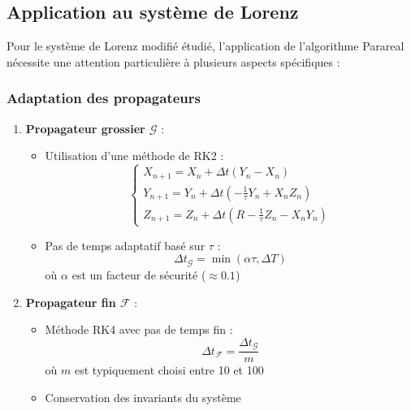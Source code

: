 \subsection{Application au système de Lorenz}
Pour le système de Lorenz modifié étudié, l'application de l'algorithme Parareal nécessite une attention particulière à plusieurs aspects spécifiques :

\subsubsection{Adaptation des propagateurs}
\begin{enumerate}
    \item \textbf{Propagateur grossier $\mathcal{G}$} :
    \begin{itemize}
        \item Utilisation d'une méthode de RK2 :
        \begin{equation}
        \begin{cases}
            X_{n+1} = X_n + \Delta t(Y_n - X_n) \\
            Y_{n+1} = Y_n + \Delta t(-\frac{1}{\tau}Y_n + X_nZ_n) \\
            Z_{n+1} = Z_n + \Delta t(R - \frac{1}{\tau}Z_n - X_nY_n)
        \end{cases}
        \end{equation}
        \item Pas de temps adaptatif basé sur $\tau$ :
        \begin{equation}
        \Delta t_{\mathcal{G}} = \min(\alpha\tau, \Delta T)
        \end{equation}
        où $\alpha$ est un facteur de sécurité ($\approx 0.1$)
    \end{itemize}

    \item \textbf{Propagateur fin $\mathcal{F}$} :
    \begin{itemize}
        \item Méthode RK4 avec pas de temps fin :
        \begin{equation}
        \Delta t_{\mathcal{F}} = \frac{\Delta t_{\mathcal{G}}}{m}
        \end{equation}
        où $m$ est typiquement choisi entre 10 et 100
        \item Conservation des invariants du système
    \end{itemize}
\end{enumerate}

